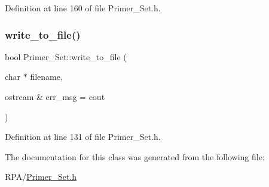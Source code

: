 Definition at line 160 of file Primer\+\_\+\+Set.\+h.

\mbox{\label{class_primer___set_a55d08f895a8af207b7e06abf8bf95f99}} 
\subsubsection{\texorpdfstring{write\+\_\+to\+\_\+file()}{write\_to\_file()}}
{\footnotesize\ttfamily bool Primer\+\_\+\+Set\+::write\+\_\+to\+\_\+file (\begin{DoxyParamCaption}\item[{char $\ast$}]{filename,  }\item[{ostream \&}]{err\+\_\+msg = {\ttfamily cout} }\end{DoxyParamCaption})}



Definition at line 131 of file Primer\+\_\+\+Set.\+h.



The documentation for this class was generated from the following file\+:\begin{DoxyCompactItemize}
\item 
R\+P\+A/\mbox{\hyperlink{_primer___set_8h}{Primer\+\_\+\+Set.\+h}}\end{DoxyCompactItemize}
